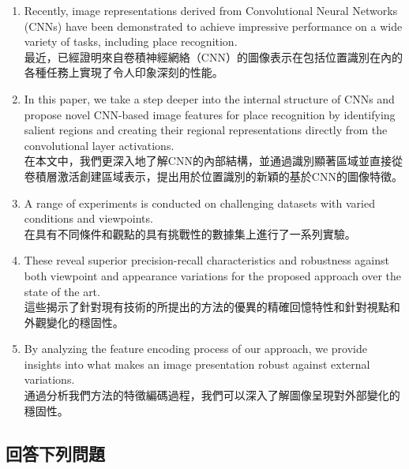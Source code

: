 \begin{enumerate}
\item Recently, image representations derived from Convolutional Neural Networks (CNNs) have been demonstrated to achieve impressive performance on a wide variety of tasks, including place recognition.\\

最近，已經證明來自卷積神經網絡（CNN）的圖像表示在包括位置識別在內的各種任務上實現了令人印象深刻的性能。

\item In this paper, we take a step deeper into the internal structure of CNNs and propose novel CNN-based image features for place recognition by identifying salient regions and creating their regional representations directly from the convolutional layer activations.\\

在本文中，我們更深入地了解CNN的內部結構，並通過識別顯著區域並直接從卷積層激活創建區域表示，提出用於位置識別的新穎的基於CNN的圖像特徵。

\item A range of experiments is conducted on challenging datasets with varied conditions and viewpoints.  \\

在具有不同條件和觀點的具有挑戰性的數據集上進行了一系列實驗。

\item These reveal superior precision-recall characteristics and robustness against both viewpoint and appearance variations for the proposed approach over the state of the art. \\

這些揭示了針對現有技術的所提出的方法的優異的精確回憶特性和針對視點和外觀變化的穩固性。

\item By analyzing the feature encoding process of our approach, we provide insights into what makes an image presentation robust against external variations. \\

通過分析我們方法的特徵編碼過程，我們可以深入了解圖像呈現對外部變化的穩固性。

\end{enumerate}

\subsection{回答下列問題}

